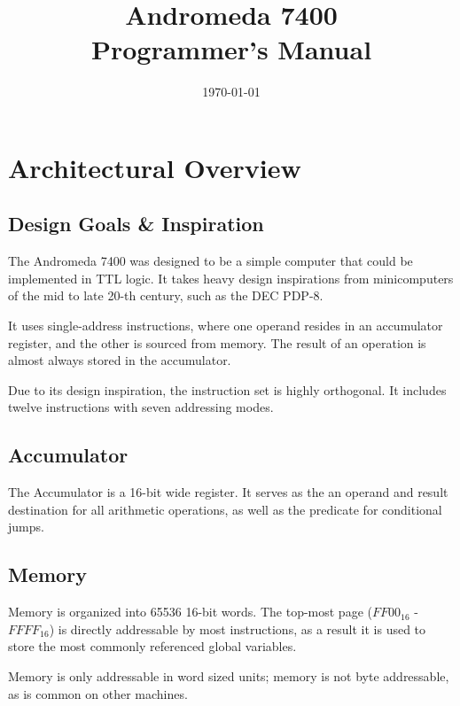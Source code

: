 \documentclass[11pt]{article}
\title{
    Andromeda 7400\\
\large Programmer's Manual}
\date{\today}
\begin{document}
    \maketitle

    \pagebreak
    \tableofcontents
    \pagebreak

    \section{Architectural Overview}\label{subsec:archetctural-overview}
    \subsection{Design Goals \& Inspiration}\label{subsec:design-goals-&-inspiration}
    \par The Andromeda 7400 was designed to be a simple computer that could be implemented in TTL logic.
    It takes heavy design inspirations from minicomputers of the mid to late 20-th century, such as the
    DEC PDP-8.
    \par It uses single-address instructions, where one operand resides in an accumulator register, and the other is
    sourced from memory.
    The result of an operation is almost always stored in the accumulator.
    \par Due to its design inspiration, the instruction set is highly orthogonal.
    It includes twelve instructions with seven addressing modes.

    \subsection{Accumulator}\label{subsec:accumulator}
    \par The Accumulator is a 16-bit wide register.
    It serves as the an operand and result destination for all arithmetic operations, as well as the predicate for conditional jumps.

    \subsection{Memory}\label{subsec:memory}
    \par Memory is organized into 65536 16-bit words.
    The top-most page ($FF00_{16}$ - $FFFF_{16}$) is directly addressable by most instructions, as a result it
    is used to store the most commonly referenced global variables.
    \par Memory is only addressable in word sized units; memory is not byte addressable, as is common on other machines.
\end{document}
